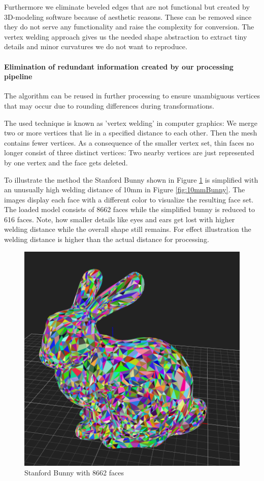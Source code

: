 \documentclass[../ClassicThesis.tex]{subfiles}
\begin{document}
Furthermore we eliminate beveled edges that are not functional but created by 3D-modeling software because of aesthetic reasons. These can be removed since they do not serve any functionality and raise the complexity for conversion. The vertex welding approach gives us the needed shape abstraction to extract tiny details and minor curvatures we do not want to reproduce. 

\paragraph*{Elimination of redundant information created by our processing pipeline}

The algorithm can be reused in further processing to ensure unambiguous vertices that may occur due to rounding differences during transformations.


The used technique is known as 'vertex welding' in computer graphics: We merge two or more vertices that lie in a specified distance to each other. Then the mesh contains fewer vertices. As a consequence of the smaller vertex set, thin faces no longer consist of three distinct vertices: Two nearby vertices are just represented by one vertex and the face gets deleted.

To illustrate the method the {\threedmodel} Stanford Bunny shown in Figure \ref{fig:origBunny} is simplified with an unusually high welding distance of 10mm in Figure \ref{fig:10mmBunny}. The images display each face with a different color to visualize the resulting face set. The loaded model consists of 8662 faces while the simplified bunny is reduced to 616 faces. Note, how smaller details like eyes and ears get lost with higher welding distance while the overall shape still remains. For effect illustration the welding distance is higher than the actual distance for processing.

\begin{figure}
\includegraphics[width=0.8\columnwidth]{Images/04-approx-welding-rabbit-original.png}
\caption{Stanford Bunny with 8662 faces}
\label{fig:origBunny}
\end{figure}
\end{document}
